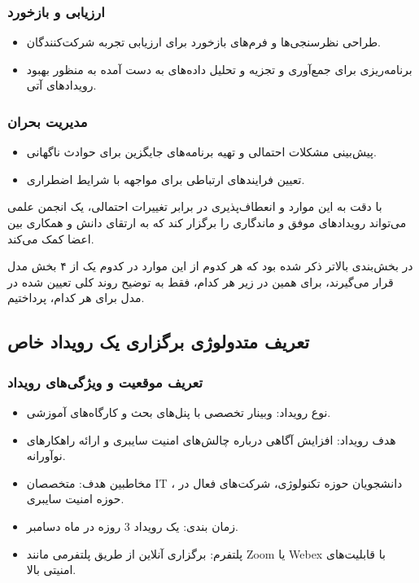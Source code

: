 \subsubsection*{ارزیابی و بازخورد}
\begin{itemize}
	\item طراحی نظرسنجی‌ها و فرم‌های بازخورد برای ارزیابی تجربه شرکت‌کنندگان.
	\item برنامه‌ریزی برای جمع‌آوری و تجزیه و تحلیل داده‌های به دست آمده به منظور بهبود رویدادهای آتی.
\end{itemize}

\subsubsection*{مدیریت بحران}
\begin{itemize}
	\item پیش‌بینی مشکلات احتمالی و تهیه برنامه‌های جایگزین برای حوادث ناگهانی.
	\item تعیین فرایندهای ارتباطی برای مواجهه با شرایط اضطراری. 
\end{itemize}

با دقت به این موارد و انعطاف‌پذیری در برابر تغییرات احتمالی، یک انجمن علمی می‌تواند رویدادهای موفق و ماندگاری را برگزار کند که به ارتقای دانش و همکاری بین اعضا کمک می‌کند.

در بخش‌بندی بالاتر ذکر شده بود که هر کدوم از این موارد در کدوم یک از ۴ بخش مدل قرار می‌گیرند، برای همین در زیر هر کدام، فقط به توضیح روند کلی تعیین شده در مدل برای هر کدام، پرداختیم.

\subsection*{تعریف متدولوژی برگزاری یک رویداد خاص}

\subsubsection*{تعریف موقعیت و ویژگی‌های رویداد}
\begin{itemize}
	\item نوع رویداد: وبینار تخصصی با پنل‌های بحث و کارگاه‌های آموزشی.
	\item هدف رویداد: افزایش آگاهی درباره چالش‌های امنیت سایبری و ارائه راهکارهای نوآورانه.
	\item مخاطبین هدف: متخصصان IT ، دانشجویان حوزه تکنولوژی، شرکت‌های فعال در حوزه امنیت سایبری.
	\item زمان بندی: یک رویداد 3 روزه در ماه دسامبر.
	\item پلتفرم: برگزاری آنلاین از طریق پلتفرمی مانند Zoom یا Webex با قابلیت‌های امنیتی بالا.
\end{itemize}


